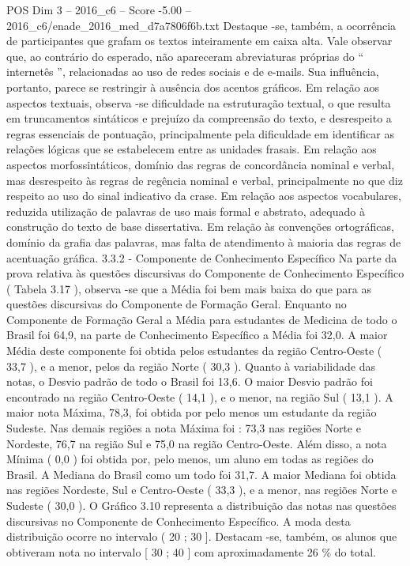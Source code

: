 \begin{textsample}{POS Dim 3 – 2016\_c6 – Score -5.00 – 2016\_c6/enade\_2016\_med\_d7a7806f6b.txt}
Destaque -se, também, a ocorrência de participantes que grafam os textos inteiramente em caixa alta.
Vale observar que, ao contrário do esperado, não apareceram abreviaturas próprias do “ internetês ”, relacionadas ao uso de redes sociais e de e-mails.
Sua influência, portanto, parece se restringir à ausência dos acentos gráficos.
Em relação aos aspectos textuais, observa -se dificuldade na estruturação textual, o que resulta em truncamentos sintáticos e prejuízo da compreensão do texto, e desrespeito a regras essenciais de pontuação, principalmente pela dificuldade em identificar as relações lógicas que se estabelecem entre as unidades frasais.
Em relação aos aspectos morfossintáticos, domínio das regras de concordância nominal e verbal, mas desrespeito às regras de regência nominal e verbal, principalmente no que diz respeito ao uso do sinal indicativo da crase.
Em relação aos aspectos vocabulares, reduzida utilização de palavras de uso mais formal e abstrato, adequado à construção do texto de base dissertativa.
Em relação às convenções ortográficas, domínio da grafia das palavras, mas falta de atendimento à maioria das regras de acentuação gráfica. 3.3.2 - Componente de Conhecimento Específico Na parte da prova relativa às questões discursivas do Componente de Conhecimento Específico ( Tabela 3.17 ), observa -se que a Média foi bem mais baixa do que para as questões discursivas do Componente de Formação Geral.
Enquanto no Componente de Formação Geral a Média para estudantes de Medicina de todo o Brasil foi 64,9, na parte de Conhecimento Específico a Média foi 32,0.
A maior Média deste componente foi obtida pelos estudantes da região Centro-Oeste ( 33,7 ), e a menor, pelos da região Norte ( 30,3 ).
Quanto à variabilidade das notas, o Desvio padrão de todo o Brasil foi 13,6.
O maior Desvio padrão foi encontrado na região Centro-Oeste ( 14,1 ), e o menor, na região Sul ( 13,1 ).
A maior nota Máxima, 78,3, foi obtida por pelo menos um estudante da região Sudeste.
Nas demais regiões a nota Máxima foi : 73,3 nas regiões Norte e Nordeste, 76,7 na região Sul e 75,0 na região Centro-Oeste.
Além disso, a nota Mínima ( 0,0 ) foi obtida por, pelo menos, um aluno em todas as regiões do Brasil.
A Mediana do Brasil como um todo foi 31,7.
A maior Mediana foi obtida nas regiões Nordeste, Sul e Centro-Oeste ( 33,3 ), e a menor, nas regiões Norte e Sudeste ( 30,0 ).
O Gráfico 3.10 representa a distribuição das notas nas questões discursivas no Componente de Conhecimento Específico.
A moda desta distribuição ocorre no intervalo ( 20 ; 30 ].
Destacam -se, também, os alunos que obtiveram nota no intervalo [ 30 ; 40 ] com aproximadamente 26 \% do total.

\end{textsample}

